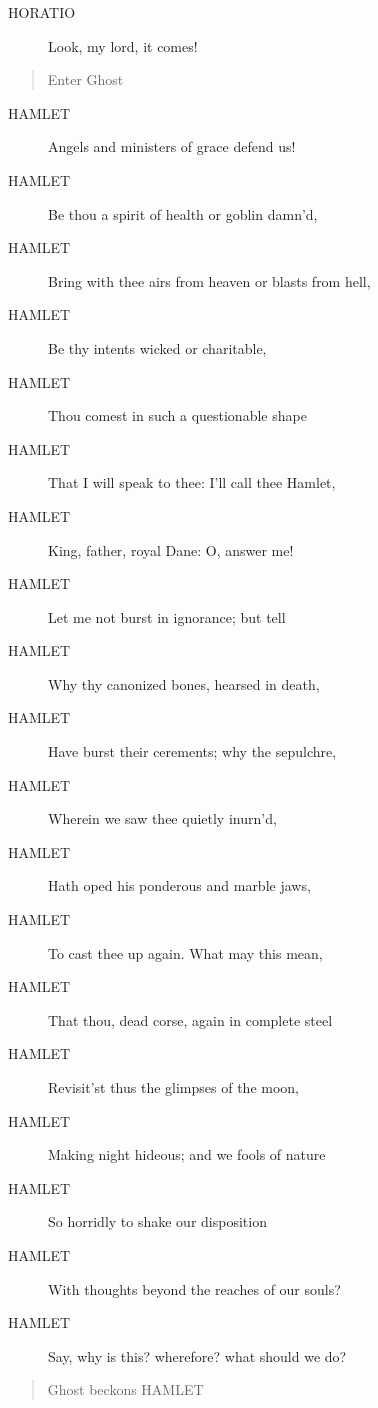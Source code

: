 \documentclass{article}
\begin{document}
\begin{description}
            
\item[HORATIO] Look, my lord, it comes!
\end{description}
          
\begin{quote}
Enter Ghost
\end{quote}
          
\begin{description}
            
\item[HAMLET] Angels and ministers of grace defend us!
\item[HAMLET] Be thou a spirit of health or goblin damn'd,
\item[HAMLET] Bring with thee airs from heaven or blasts from hell,
\item[HAMLET] Be thy intents wicked or charitable,
\item[HAMLET] Thou comest in such a questionable shape
\item[HAMLET] That I will speak to thee: I'll call thee Hamlet,
\item[HAMLET] King, father, royal Dane: O, answer me!
\item[HAMLET] Let me not burst in ignorance; but tell
\item[HAMLET] Why thy canonized bones, hearsed in death,
\item[HAMLET] Have burst their cerements; why the sepulchre,
\item[HAMLET] Wherein we saw thee quietly inurn'd,
\item[HAMLET] Hath oped his ponderous and marble jaws,
\item[HAMLET] To cast thee up again. What may this mean,
\item[HAMLET] That thou, dead corse, again in complete steel
\item[HAMLET] Revisit'st thus the glimpses of the moon,
\item[HAMLET] Making night hideous; and we fools of nature
\item[HAMLET] So horridly to shake our disposition
\item[HAMLET] With thoughts beyond the reaches of our souls?
\item[HAMLET] Say, why is this? wherefore? what should we do?
\end{description}
          
\begin{quote}
Ghost beckons HAMLET
\end{quote}
          
\end{document}
